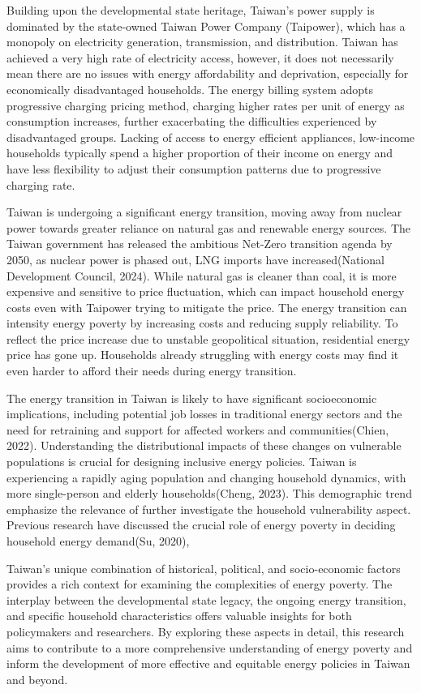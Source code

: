 \documentclass[
  twoside,
  openright,
  degree    = master,               %
  language  = english,              %
  fontset   = overleaf,             %
  watermark = true,                 %
  doi       = true,                 %
]{ntuthesis}
\begin{document}
Building upon the developmental state heritage, Taiwan's power supply is
dominated by the state-owned Taiwan Power Company (Taipower), which has
a monopoly on electricity generation, transmission, and distribution.
Taiwan has achieved a very high rate of electricity access, however, it
does not necessarily mean there are no issues with energy affordability
and deprivation, especially for economically disadvantaged households.
The energy billing system adopts progressive charging pricing method,
charging higher rates per unit of energy as consumption increases,
further exacerbating the difficulties experienced by disadvantaged
groups. Lacking of access to energy efficient appliances, low-income
households typically spend a higher proportion of their income on energy
and have less flexibility to adjust their consumption patterns due to
progressive charging rate.

Taiwan is undergoing a significant energy transition, moving away from
nuclear power towards greater reliance on natural gas and renewable
energy sources. The Taiwan government has released the ambitious
Net-Zero transition agenda by 2050, as nuclear power is phased out, LNG
imports have increased(National Development Council, 2024). While
natural gas is cleaner than coal, it is more expensive and sensitive to
price fluctuation, which can impact household energy costs even with
Taipower trying to mitigate the price. The energy transition can
intensity energy poverty by increasing costs and reducing supply
reliability. To reflect the price increase due to unstable geopolitical
situation, residential energy price has gone up. Households already
struggling with energy costs may find it even harder to afford their
needs during energy transition.

The energy transition in Taiwan is likely to have significant
socioeconomic implications, including potential job losses in
traditional energy sectors and the need for retraining and support for
affected workers and communities(Chien, 2022). Understanding the
distributional impacts of these changes on vulnerable populations is
crucial for designing inclusive energy policies. Taiwan is experiencing
a rapidly aging population and changing household dynamics, with more
single-person and elderly households(Cheng, 2023). This demographic
trend emphasize the relevance of further investigate the household
vulnerability aspect. Previous research have discussed the crucial role
of energy poverty in deciding household energy demand(Su, 2020),

Taiwan's unique combination of historical, political, and socio-economic
factors provides a rich context for examining the complexities of energy
poverty. The interplay between the developmental state legacy, the
ongoing energy transition, and specific household characteristics offers
valuable insights for both policymakers and researchers. By exploring
these aspects in detail, this research aims to contribute to a more
comprehensive understanding of energy poverty and inform the development
of more effective and equitable energy policies in Taiwan and beyond.
\end{document}
